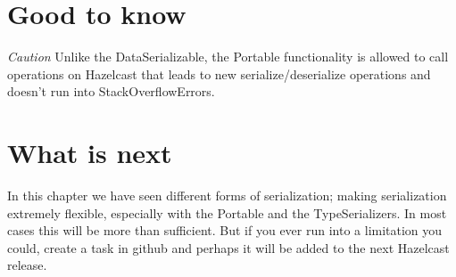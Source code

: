 \section{Good to know}

\emph{Caution} Unlike the DataSerializable, the Portable functionality is allowed to call operations on Hazelcast that leads to new serialize/deserialize operations and doesn't run into StackOverflowErrors.

\section{What is next}
In this chapter we have seen different forms of serialization; making serialization extremely flexible, especially with the Portable and the TypeSerializers. In most cases this will be more than sufficient. But if you ever run into a limitation you could, create a task in github and perhaps it will be added to the next Hazelcast release.